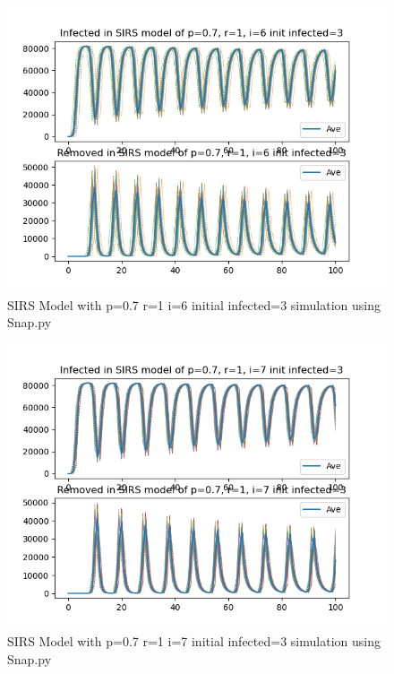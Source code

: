 \documentclass{subfile}
\begin{document}
  \begin{figure}
  \includegraphics[scale=0.8]{sirsp07r1i6s3}
  \caption[SIRS p=0.7,r=1,i=6,init infected=3]{SIRS Model with p=0.7 r=1 i=6 initial infected=3 simulation using Snap.py}
  \end{figure}
  \begin{figure}
  \includegraphics[scale=0.8]{sirsp07r1i7s3}
  \caption[SIRS p=0.7,r=1,i=7,init infected=3]{SIRS Model with p=0.7 r=1 i=7 initial infected=3 simulation using Snap.py}
  \end{figure}
\end{document}
